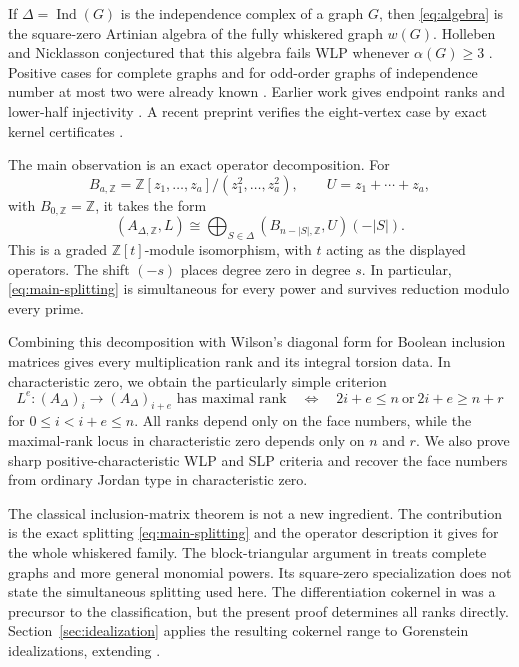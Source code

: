 \documentclass[11pt]{article}
\theoremstyle{remark}
\newcommand{\ZZ}{\mathbb Z}
\newcommand{\Ind}{\operatorname{Ind}}
\begin{document}
If $\Delta=\Ind(G)$ is the independence complex of a graph $G$, then \eqref{eq:algebra} is the square-zero Artinian algebra of the fully whiskered graph $w(G)$. Holleben and Nicklasson conjectured that this algebra fails WLP whenever $\alpha(G)\geq3$ \cite[Conjectures 1.3 and 3.15]{HN}. Positive cases for complete graphs and for odd-order graphs of independence number at most two were already known \cite[Propositions 3.2 and 3.5]{HN}. Earlier work gives endpoint ranks and lower-half injectivity \cite[Theorem 1.2]{CFHNV}. A recent preprint verifies the eight-vertex case by exact kernel certificates \cite{Zeng}.

The main observation is an exact operator decomposition. For
\[
 B_{a,\ZZ}=\ZZ[z_1,\ldots,z_a]/(z_1^2,\ldots,z_a^2),
 \qquad U=z_1+\cdots+z_a,
\]
with $B_{0,\ZZ}=\ZZ$, it takes the form
\begin{equation}\label{eq:main-splitting}
 (A_{\Delta,\ZZ},L)\cong
 \bigoplus_{S\in\Delta}(B_{n-|S|,\ZZ},U)(-|S|).
\end{equation}
This is a graded $\ZZ[t]$-module isomorphism, with $t$ acting as the displayed operators. The shift $(-s)$ places degree zero in degree $s$. In particular, \eqref{eq:main-splitting} is simultaneous for every power and survives reduction modulo every prime.

Combining this decomposition with Wilson's diagonal form for Boolean inclusion matrices \cite{Wilson,GKKM} gives every multiplication rank and its integral torsion data. In characteristic zero, we obtain the particularly simple criterion
\begin{equation}\label{eq:locus-intro}
 L^e:(A_\Delta)_i\longrightarrow(A_\Delta)_{i+e}
 \text{ has maximal rank}
 \quad\Longleftrightarrow\quad
 2i+e\leq n\ \text{or}\ 2i+e\geq n+r
\end{equation}
for $0\leq i<i+e\leq n$. All ranks depend only on the face numbers, while the maximal-rank locus in characteristic zero depends only on $n$ and $r$. We also prove sharp positive-characteristic WLP and SLP criteria and recover the face numbers from ordinary Jordan type in characteristic zero.

The classical inclusion-matrix theorem is not a new ingredient. The contribution is the exact splitting \eqref{eq:main-splitting} and the operator description it gives for the whole whiskered family. The block-triangular argument in \cite[Lemma 3.1]{HN} treats complete graphs and more general monomial powers. Its square-zero specialization does not state the simultaneous splitting used here. The differentiation cokernel in \cite[Theorem 3.10]{HN} was a precursor to the classification, but the present proof determines all ranks directly. Section~\ref{sec:idealization} applies the resulting cokernel range to Gorenstein idealizations, extending \cite[Theorem 4.6]{HN}.
\end{document}
